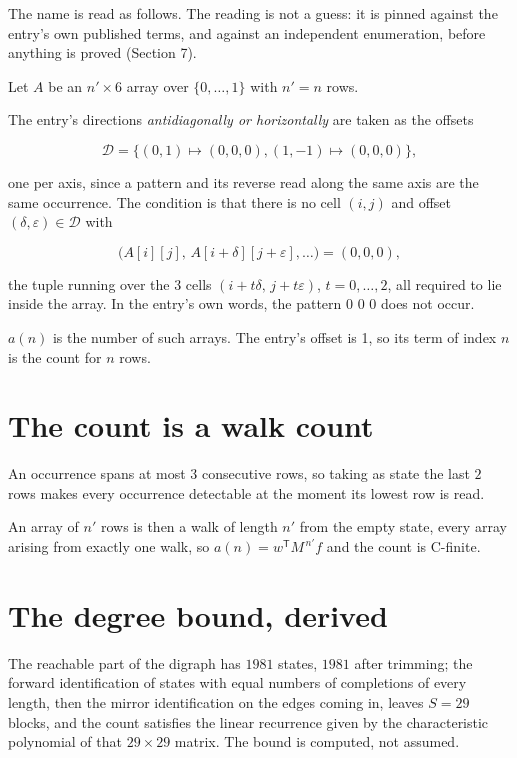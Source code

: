 \documentclass[11pt]{article}
\theoremstyle{definition}
\begin{document}
The name is read as follows. The reading is not a guess: it is pinned against the entry's own published terms, and against an independent enumeration, before anything is proved (Section 7).

Let $A$ be an $n' \times 6$ array over $\{0,\dots,1\}$ with $n' = n$ rows.

The entry's directions {\itshape antidiagonally or horizontally} are taken as the offsets

\[\mathcal{D} = \{(0,1)\mapsto(0,0,0), (1,-1)\mapsto(0,0,0)\},\]

one per axis, since a pattern and its reverse read along the same axis are the same occurrence. The condition is that there is no cell $(i,j)$ and offset $(\delta,\varepsilon)\in\mathcal{D}$ with

\[\bigl(A[i][j],\,A[i{+}\delta][j{+}\varepsilon],\dots\bigr) = (0, 0, 0),\]

the tuple running over the $3$ cells $(i+t\delta,\,j+t\varepsilon)$, $t = 0,\dots,2$, all required to lie inside the array. In the entry's own words, the pattern 0 0 0 does not occur.

$a(n)$ is the number of such arrays. The entry's offset is 1, so its term of index $n$ is the count for $n$ rows.

\section{The count is a walk count}

An occurrence spans at most $3$ consecutive rows, so taking as state the last $2$ rows makes every occurrence detectable at the moment its lowest row is read.

An array of $n'$ rows is then a walk of length $n'$ from the empty state, every array arising from exactly one walk, so $a(n) = w^{\mathsf T}M^{\,n'}f$ and the count is C-finite.

\section{The degree bound, derived}

The reachable part of the digraph has $1981$ states, $1981$ after trimming; the forward identification of states with equal numbers of completions of every length, then the mirror identification on the edges coming in, leaves $S = 29$ blocks, and the count satisfies the linear recurrence given by the characteristic polynomial of that $29\times29$ matrix. The bound is computed, not assumed.
\end{document}
